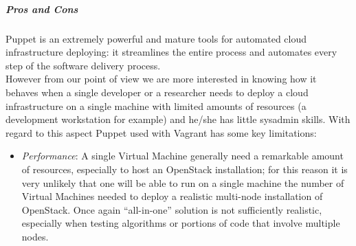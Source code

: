 \subparagraph{Pros and Cons}
\label{subp:sota_puppet_pro_cons}
Puppet is an extremely powerful and mature tools for automated cloud infrastructure deploying: it streamlines the entire process and automates every step of the software delivery process.\\
However from our point of view we are more interested in knowing how it behaves when a single developer or a researcher needs to deploy a cloud infrastructure on a single machine with limited amounts of resources (a development workstation for example) and he/she has little sysadmin skills. With regard to this aspect Puppet used with Vagrant has some key limitations:

\begin{itemize}
\item \textit{Performance}: A single Virtual Machine generally need a remarkable amount of resources, especially to host an OpenStack installation; for this reason it is very unlikely that one will be able to run on a single machine the number of Virtual Machines needed to deploy a realistic multi-node installation of OpenStack. Once again ``all-in-one'' solution is not sufficiently realistic, especially when testing algorithms or portions of code that involve multiple nodes.
\end{itemize}



